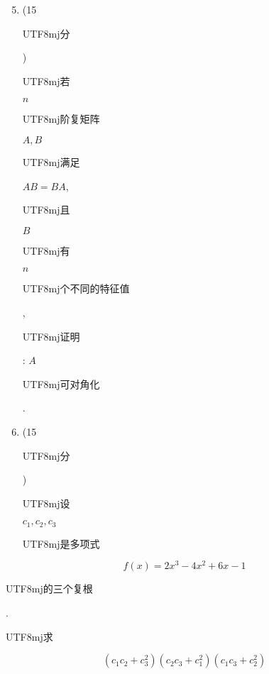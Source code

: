 \documentclass[10pt]{article}
\begin{document}
\begin{enumerate}
  \setcounter{enumi}{4}
  \item (15 \begin{CJK}{UTF8}{mj}分\end{CJK}) \begin{CJK}{UTF8}{mj}若\end{CJK} $n$ \begin{CJK}{UTF8}{mj}阶复矩阵\end{CJK} $A, B$ \begin{CJK}{UTF8}{mj}满足\end{CJK} $A B=B A$, \begin{CJK}{UTF8}{mj}且\end{CJK} $B$ \begin{CJK}{UTF8}{mj}有\end{CJK} $n$ \begin{CJK}{UTF8}{mj}个不同的特征值\end{CJK}, \begin{CJK}{UTF8}{mj}证明\end{CJK}: $A$ \begin{CJK}{UTF8}{mj}可对角化\end{CJK}.

  \item (15 \begin{CJK}{UTF8}{mj}分\end{CJK}) \begin{CJK}{UTF8}{mj}设\end{CJK} $c_{1}, c_{2}, c_{3}$ \begin{CJK}{UTF8}{mj}是多项式\end{CJK}

\end{enumerate}
$$
f(x)=2 x^{3}-4 x^{2}+6 x-1
$$
\begin{CJK}{UTF8}{mj}的三个复根\end{CJK}. \begin{CJK}{UTF8}{mj}求\end{CJK}
$$
\left(c_{1} c_{2}+c_{3}^{2}\right)\left(c_{2} c_{3}+c_{1}^{2}\right)\left(c_{1} c_{3}+c_{2}^{2}\right)
$$
\end{document}
